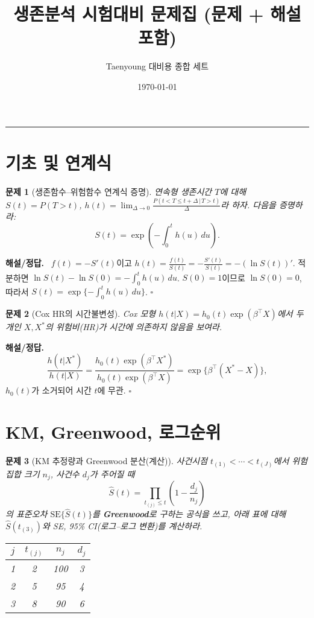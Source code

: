 \documentclass[12pt]{article}
\title{생존분석 시험대비 문제집 (문제 + 해설 포함)}
\author{Taenyoung 대비용 종합 세트}
\date{\today}
\theoremstyle{myplain}
\newtheorem{problem}{문제}
\newenvironment{solution}{%
  \par\noindent\textbf{해설/정답.}\ }{\hfill$\square$\par}
\begin{document}
\maketitle


\hrule
\vspace{0.6em}

\section{기초 및 연계식}

\begin{problem}[생존함수--위험함수 연계식 증명]
연속형 생존시간 $T$에 대해 $S(t)=P(T>t)$, $h(t)=\lim_{\Delta\to0} \frac{P(t<T\le t+\Delta\,|\,T>t)}{\Delta}$라 하자. 다음을 증명하라:
\[
S(t) = \exp\!\left(-\int_0^t h(u)\,du\right).
\]
\end{problem}

\begin{solution}
$f(t)=-S'(t)$이고 $h(t)=\frac{f(t)}{S(t)}=-\frac{S'(t)}{S(t)}=-(\ln S(t))'$. 적분하면
$\ln S(t)-\ln S(0)=-\int_0^t h(u)\,du$. $S(0)=1$이므로 $\ln S(0)=0$, 따라서
$S(t)=\exp\{-\int_0^t h(u)\,du\}$.
\end{solution}

\begin{problem}[Cox HR의 시간불변성]
Cox 모형 $h(t|X)=h_0(t)\exp(\beta^\top X)$에서 두 개인 $X,X^\ast$의 위험비(HR)가 시간에 의존하지 않음을 보여라.
\end{problem}

\begin{solution}
\[
\frac{h(t|X^\ast)}{h(t|X)}=\frac{h_0(t)\exp(\beta^\top X^\ast)}{h_0(t)\exp(\beta^\top X)}
=\exp\{\beta^\top(X^\ast-X)\},
\]
$h_0(t)$가 소거되어 시간 $t$에 무관.
\end{solution}

\section{KM, Greenwood, 로그순위}

\begin{problem}[KM 추정량과 Greenwood 분산(계산)]
사건시점 $t_{(1)}<\cdots<t_{(J)}$에서 위험집합 크기 $n_j$, 사건수 $d_j$가 주어질 때
\[
\hat S(t)=\prod_{t_{(j)}\le t}\left(1-\frac{d_j}{n_j}\right)
\]
의 표준오차 $\mathrm{SE}\{\hat S(t)\}$를 \textbf{Greenwood}로 구하는 공식을 쓰고, 아래 표에 대해 $\hat S(t_{(3)})$와 SE, 95\% CI(로그--로그 변환)를 계산하라.

\medskip
\begin{center}
\begin{tabular}{cccc}
\toprule
$j$ & $t_{(j)}$ & $n_j$ & $d_j$ \\
\midrule
1 & 2 & 100 & 3 \\
2 & 5 & 95 & 4 \\
3 & 8 & 90 & 6 \\
\bottomrule
\end{tabular}
\end{center}
\end{problem}
\end{document}

